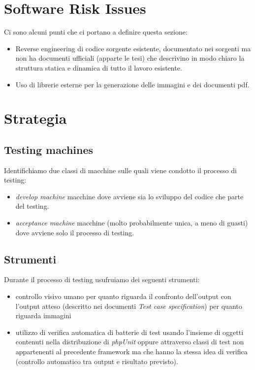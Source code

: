 \section{Software Risk Issues}
Ci sono alcuni punti che ci portano a definire questa sezione:
\begin{itemize}
  \item Reverse engineering di codice sorgente esistente, documentato nei sorgenti
ma non ha documenti ufficiali (apparte le tesi) che descrivino in modo chiaro
la struttura statica e dinamica di tutto il lavoro esistente.
  \item Uso di librerie esterne per la generazione delle immagini e dei
  documenti pdf.
\end{itemize}

\section{Strategia}

\subsection{Testing machines}
Identifichiamo due classi di macchine sulle quali viene condotto il processo di
testing:
\begin{itemize}
  \item \emph{develop machine} macchine dove avviene sia lo sviluppo del codice
  che parte del testing.
  \item \emph{acceptance machine} macchine (molto probabilmente unica, a meno
  di guasti) dove avviene solo il processo di testing.
\end{itemize}

\subsection{Strumenti}
\label{subsec:testingTools}
Durante il processo di testing usufruiamo dei seguenti strumenti:
\begin{itemize}
  \item controllo visivo umano per quanto riguarda il confronto dell'output
  con l'output atteso (descritto nei documenti \emph{Test case specification})
  per quanto riguarda immagini
  \item utilizzo di verifica automatica di batterie di test usando l'insieme di
  oggetti contenuti nella distribuzione di \emph{phpUnit} oppure attraverso
  classi di test non appartenenti al precedente framework ma che hanno la
  stessa idea di verifica (controllo automatico tra output e risultato
  previsto).
\end{itemize}

